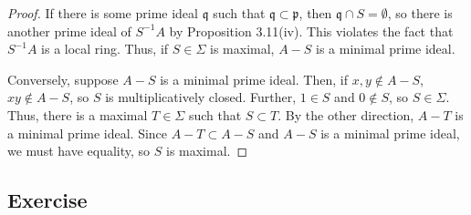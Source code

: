\begin{proof}
If there is some prime ideal $\mathfrak{q}$ such that $\mathfrak{q} \subset \mathfrak{p}$, then $\mathfrak{q} \cap S = \emptyset$, so there is another prime ideal of $S^{-1}A$ by Proposition 3.11(iv). This
violates the fact that $S^{-1}A$ is a local ring. Thus, if $S \in \Sigma$ is maximal, $A - S$ is a minimal prime ideal.

Conversely, suppose $A - S$ is a minimal prime ideal. Then, if $x,y \not\in A - S$, $xy \not\in A - S$, so $S$ is multiplicatively closed. Further, $1 \in S$ and $0 \not\in S$, so $S \in \Sigma$. Thus, there is a maximal
$T \in \Sigma$ such that $S \subset T$. By the other direction, $A - T$ is a minimal prime ideal. Since $A - T \subset A - S$ and $A-S$ is a minimal prime ideal, we must have equality, so $S$ is maximal.
\end{proof}

\subsection{Exercise}\label{3.7}

